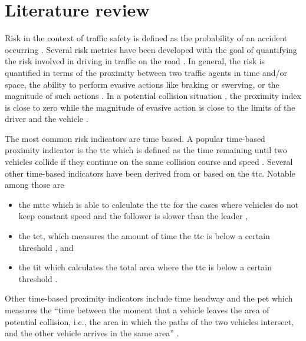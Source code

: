 \section{Literature review}
\label{sec:literature review}

Risk in the context of traffic safety is defined as the probability of an accident occurring \autocite{hakkert2002uses}.
Several risk metrics have been developed with the goal of quantifying the risk involved in driving in traffic on the road \autocite{minderhoud2001extended, ozbay2008derivation, cunto2009simulated, laureshyn2010evaluation}.
In general, the risk is quantified in terms of the proximity between two traffic agents in time and/or space, the ability to perform evasive actions like braking or swerving, or the magnitude of such actions \autocite{shi2018key,zheng2020modeling}. 
In a potential collision situation , the proximity index is close to zero while the magnitude of evasive action is close to the limits of the driver and the vehicle \autocite{zheng2020modeling}. 

The most common risk indicators are time based. 
A popular time-based proximity indicator is the \ac{ttc} which is defined as the time remaining until two vehicles collide if they continue on the same collision course and speed \autocite{vanderhorst1990time}. 
Several other time-based indicators have been derived from or based on the \ac{ttc}. 
Notable among those are 
\begin{itemize}
    \item the \ac{mttc} which is able to calculate the \ac{ttc} for the cases where vehicles do not keep constant speed and the follower is slower than the leader \autocite{ozbay2008derivation},
    \item the \ac{tet}, which measures the amount of time the \ac{ttc} is below a certain threshold \autocite{minderhoud2001extended}, and
    \item the \ac{tit} which calculates the total area where the \ac{ttc} is below a certain threshold  \autocite{minderhoud2001extended}. 
\end{itemize}
Other time-based proximity indicators include time headway and the \ac{pet} which measures the ``time between the moment that a vehicle leaves the area of potential collision, i.e., the area in which the paths of the two vehicles intersect, and the other vehicle arrives in the same area'' \autocite{mahmud2017application}. 

